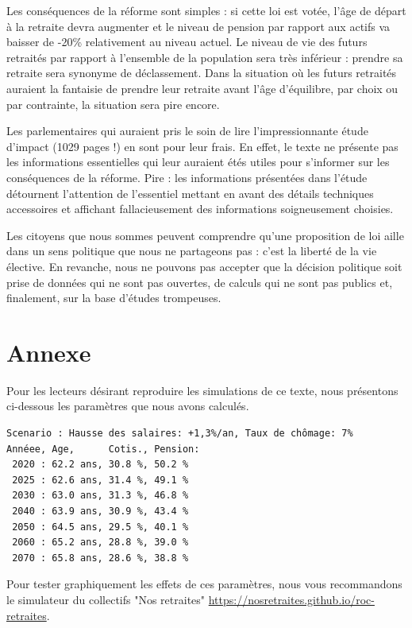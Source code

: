 \documentclass[10pt]{article}
\begin{document}
Les conséquences de la réforme sont simples : 
si cette loi est votée, l'âge de départ à la retraite 
devra augmenter et le niveau de pension par rapport aux actifs va 
baisser de -20\% relativement au niveau actuel. 
Le niveau de vie des futurs retraités par rapport à l'ensemble de la 
population sera très inférieur : prendre sa retraite sera synonyme de 
déclassement. 
Dans la situation où les futurs retraités auraient la fantaisie 
de prendre leur retraite avant l'âge d'équilibre, par choix ou par contrainte, 
la situation sera pire encore. 

Les parlementaires qui auraient pris le soin de lire l'impressionnante 
étude d'impact (1029 pages !) en sont pour leur frais. 
En effet, le texte ne présente pas les informations essentielles qui leur auraient étés 
utiles pour s'informer sur les conséquences de la réforme. 
Pire : les informations présentées dans l'étude détournent l'attention de l'essentiel 
mettant en avant des détails techniques accessoires et affichant fallacieusement 
des informations soigneusement choisies. 

Les citoyens que nous sommes peuvent comprendre qu'une proposition de loi 
aille dans un sens politique que nous ne partageons pas : c'est la 
liberté de la vie élective. 
En revanche, nous ne pouvons pas accepter que la décision politique soit 
prise de données qui ne sont pas ouvertes, 
de calculs qui ne sont pas publics et, finalement, sur la base d'études trompeuses. 


\section{Annexe}

Pour les lecteurs désirant reproduire les simulations de ce texte, 
nous présentons ci-dessous les paramètres que nous avons calculés.
\begin{verbatim}
Scenario : Hausse des salaires: +1,3%/an, Taux de chômage: 7%
Annéee, Age,      Cotis., Pension:
 2020 : 62.2 ans, 30.8 %, 50.2 %
 2025 : 62.6 ans, 31.4 %, 49.1 %
 2030 : 63.0 ans, 31.3 %, 46.8 %
 2040 : 63.9 ans, 30.9 %, 43.4 %
 2050 : 64.5 ans, 29.5 %, 40.1 %
 2060 : 65.2 ans, 28.8 %, 39.0 %
 2070 : 65.8 ans, 28.6 %, 38.8 %
\end{verbatim}

Pour tester graphiquement les effets de ces paramètres, nous vous recommandons le 
simulateur du collectifs "Nos retraites" \url{https://nosretraites.github.io/roc-retraites}. 
\end{document}
